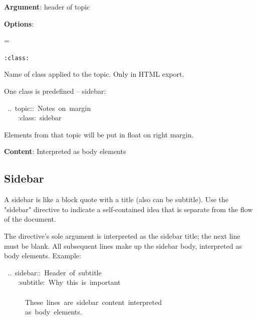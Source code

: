 \documentclass[12pt]{article}
\newenvironment{deflist}[1]{%
\begin{list}{}
{\renewcommand{\makelabel}[1]{\textbf{##1}\hfill}
\settowidth{\labelwidth}{\textbf{#1}}
\leftmargin=\labelwidth
\advance \leftmargin\labelsep}}
{\end{list}}
\begin{document}
\begin{itemize}
\item
\textbf{Argument}: header of topic

\item
\textbf{Options}:

 \begin{deflist}{iii}

\item[ \texttt{:class:}]

Name of class applied to the topic. Only in HTML export.

 One class is predefined -- sidebar:

\begin{ttfamily}\begin{flushleft}
\mbox{~..~topic::~Notes~on~margin}\\
\mbox{~~~~:class:~sidebar}\\
\end{flushleft}\end{ttfamily}

 Elements from that topic will be put in float on right margin.
\end{deflist}

\item
\textbf{Content}: Interpreted as body elements
\end{itemize}
\hypertarget{lsidebar}{}
\subsection{Sidebar}

A sidebar is like a block quote with a title (also can be subtitle). Use the
"sidebar" directive to indicate a self-contained idea that is separate from
the flow of the document.

The directive's sole argument is interpreted as the sidebar title; the next
line must be blank. All subsequent lines make up the sidebar body, interpreted
as body elements. Example:

\begin{ttfamily}\begin{flushleft}
\mbox{~..~sidebar::~Header~of~subtitle}\\
\mbox{~~~~:subtitle:~Why~this~is~important}\\
\mbox{}\\
\mbox{~~~~~~These~lines~are~sidebar~content~interpreted}\\
\mbox{~~~~~~as~body~elements.}\\
\end{flushleft}\end{ttfamily}
\end{document}
